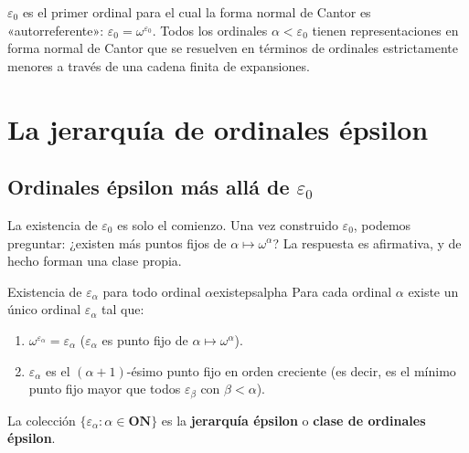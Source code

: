 \begin{importante}
$\varepsilon_0$ es el primer ordinal para el cual la forma normal de Cantor es «autorreferente»: $\varepsilon_0 = \omega^{\varepsilon_0}$. Todos los ordinales $\alpha < \varepsilon_0$ tienen representaciones en forma normal de Cantor que se resuelven en términos de ordinales estrictamente menores a través de una cadena finita de expansiones.
\end{importante}

\section{La jerarquía de ordinales épsilon}

\subsection{Ordinales épsilon más allá de $\varepsilon_0$}

La existencia de $\varepsilon_0$ es solo el comienzo. Una vez construido $\varepsilon_0$, podemos preguntar: ¿existen más puntos fijos de $\alpha \mapsto \omega^\alpha$? La respuesta es afirmativa, y de hecho forman una clase propia.

\begin{teorema}{Existencia de $\varepsilon_{\alpha}$ para todo ordinal $\alpha$}{existepsalpha}
Para cada ordinal $\alpha$ existe un único ordinal $\varepsilon_\alpha$ tal que:
\begin{enumerate}[leftmargin=2em, label=(\roman*)]
  \item $\omega^{\varepsilon_\alpha} = \varepsilon_\alpha$ \quad ($\varepsilon_\alpha$ es punto fijo de $\alpha \mapsto \omega^\alpha$).
  \item $\varepsilon_\alpha$ es el $(\alpha+1)$-ésimo punto fijo en orden creciente \quad (es decir, es el mínimo punto fijo mayor que todos $\varepsilon_\beta$ con $\beta < \alpha$).
\end{enumerate}
La colección $\{\varepsilon_\alpha : \alpha \in \mathbf{ON}\}$ es la \textbf{jerarquía épsilon} o \textbf{clase de ordinales épsilon}.
\end{teorema}

